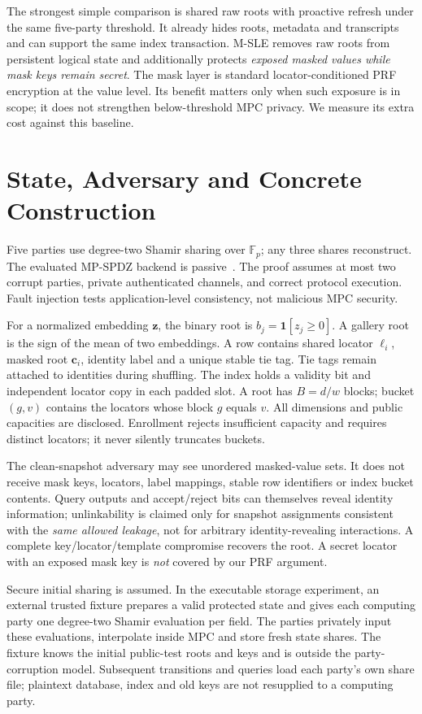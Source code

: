\documentclass[journal]{IEEEtran}
\newcommand{\MSLE}{\textsc{M-SLE}\xspace}
\begin{document}
The strongest simple comparison is shared raw roots with proactive refresh under the same five-party threshold. It already hides roots, metadata and transcripts and can support the same index transaction. \MSLE removes raw roots from persistent logical state and additionally protects \emph{exposed masked values while mask keys remain secret}. The mask layer is standard locator-conditioned PRF encryption at the value level. Its benefit matters only when such exposure is in scope; it does not strengthen below-threshold MPC privacy. We measure its extra cost against this baseline.

\section{State, Adversary and Concrete Construction}
Five parties use degree-two Shamir sharing over $\mathbb F_p$; any three shares reconstruct. The evaluated MP-SPDZ backend is passive~\cite{keller2020mpspdz}. The proof assumes at most two corrupt parties, private authenticated channels, and correct protocol execution. Fault injection tests application-level consistency, not malicious MPC security.

For a normalized embedding $\mathbf z$, the binary root is $b_j=\mathbf1[z_j\ge0]$. A gallery root is the sign of the mean of two embeddings. A row contains shared locator $\ell_i$, masked root $\mathbf c_i$, identity label and a unique stable tie tag. Tie tags remain attached to identities during shuffling. The index holds a validity bit and independent locator copy in each padded slot. A root has $B=d/w$ blocks; bucket $(g,v)$ contains the locators whose block $g$ equals $v$. All dimensions and public capacities are disclosed. Enrollment rejects insufficient capacity and requires distinct locators; it never silently truncates buckets.

The clean-snapshot adversary may see unordered masked-value sets. It does not receive mask keys, locators, label mappings, stable row identifiers or index bucket contents. Query outputs and accept/reject bits can themselves reveal identity information; unlinkability is claimed only for snapshot assignments consistent with the \emph{same allowed leakage}, not for arbitrary identity-revealing interactions. A complete key/locator/template compromise recovers the root. A secret locator with an exposed mask key is \emph{not} covered by our PRF argument.

Secure initial sharing is assumed. In the executable storage experiment, an external trusted fixture prepares a valid protected state and gives each computing party one degree-two Shamir evaluation per field. The parties privately input these evaluations, interpolate inside MPC and store fresh state shares. The fixture knows the initial public-test roots and keys and is outside the party-corruption model. Subsequent transitions and queries load each party's own share file; plaintext database, index and old keys are not resupplied to a computing party.
\end{document}
